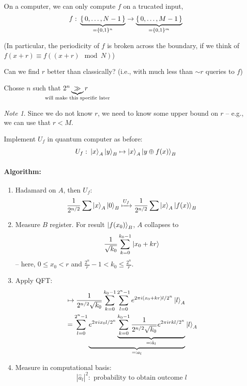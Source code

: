 \documentclass[a4paper, 12pt]{article}
\theoremstyle{plain}
\theoremstyle{definition}
\theoremstyle{remark}
\newtheorem*{note}{Note}
\begin{document}
On a computer, we can only compute $f$ on a trucated input,
\begin{equation*}
  f:\: \underbrace{\set{0,\ldots,N-1}}_{=\{0,1\}^n} \rightarrow \underbrace{\set{0,\ldots,M-1}}_{=\{0,1\}^m}
\end{equation*}

\begin{center}
  (In particular, the periodicity of $f$ is broken across the boundary, if we think of $f(x+r) \equiv f((x+r) \mod N)$)
\end{center}

Can we find $r$ better than classically? (i.e., with much less than $\sim r$ queries to $f$)

Chosse $n$ such that $2^n \underbrace{\gg}_{\mathclap{\text{will make this specific later}}}r$

\begin{note}
  Since we do not know $r$, we need to know some upper bound on $r$ -- e.g., we can use that $r < M$.
\end{note}

Implement $U_f$ in quantum computer as before:
\begin{equation*}
  U_f:\: \ket{x}_A\ket{y}_B \mapsto \ket{x}_A\ket{y \oplus f(x)}_B
\end{equation*}

\paragraph{Algorithm:}
\begin{enumerate}[label=(\arabic*)]
  \item Hadamard on $A$, then $U_f$:
    \begin{equation*}
      \frac{1}{2^{n/2}}\sum\ket{x}_A\ket{0}_B \xmapsto{U_f} \frac{1}{2^{n/2}}\sum\ket{x}_A\ket{f(x)}_B
    \end{equation*}
  \item Measure $B$ register. For result $\ket{f(x_0)}_B$, $A$ collapses to
    \begin{equation*}
      \frac{1}{\sqrt{k_0}}\sum_{k=0}^{k_0-1}\ket{x_0+kr}
    \end{equation*}
    -- here, $0\leq x_0 < r$ and $\frac{2^n}{r} - 1 < k_0 \leq \frac{2^n}{r}$.
  \item Apply QFT:
    \begin{align*}
      &\mapsto \frac{1}{2^{n/2}\sqrt{k_0}}\sum_{k=0}^{k_0-1}\sum_{l=0}^{2^n-1}e^{2\pi i(x_0+kr)l/2^n}\ket{l}_A\\
      &= \sum_{l=0}^{2^n-1} \underbrace{e^{2\pi i x_0 l/2^n} \underbrace{\sum_{k=0}^{k_0-1} \frac{1}{2^{n/2}\sqrt{k_0}} e^{2\pi i rkl/2^n}}_{\eqcolon \hat{a}_l}}_{\eqcolon a_l}\ket{l}_A
    \end{align*}
  \item Measure in computational basis:
    \begin{equation*}
      |\hat{a}_l|^2: \text{ probability to obtain outcome } l
    \end{equation*}
\end{enumerate}
\end{document}
